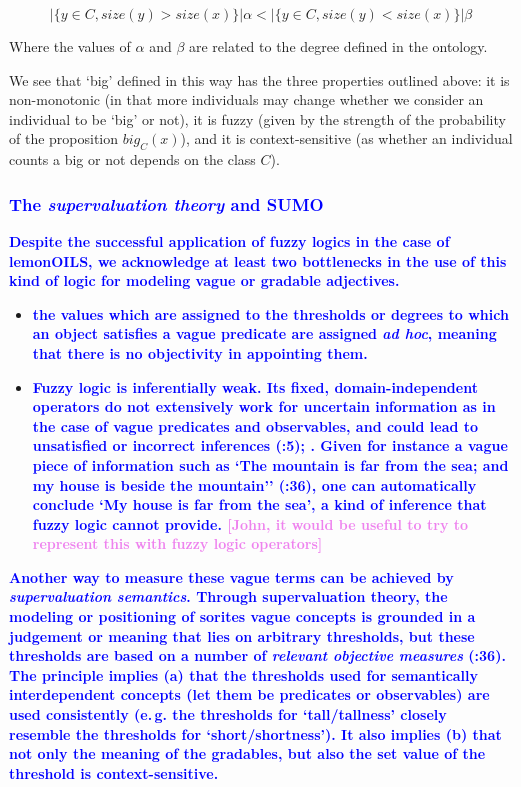 \documentclass[11pt]{article}
\begin{document}
$$|\{y \in C, size(y) > size(x)\}| \alpha < |\{y \in C, size(y) < size(x)\}| \beta$$

Where the values of $\alpha$ and $\beta$ are related to the degree defined
in the ontology.

We see that `big' defined in this way has the three properties outlined above: 
it is non-monotonic (in that more individuals may change whether we consider an individual 
to be `big' or not), it is fuzzy (given by the strength of the probability of the proposition $big_C(x)$), 
and it is context-sensitive (as whether an individual counts a big or not depends on the class $C$).

\subsubsection{\textcolor{blue}{The \textit{supervaluation theory} and SUMO}}
\textbf{\textcolor{blue}{Despite the successful application of fuzzy logics in the case of lemonOILS, we acknowledge at least two bottlenecks in the use of this kind of logic for modeling vague or gradable adjectives.}}

\begin{itemize}
\item \textbf{\textcolor{blue}{the values which are assigned to the thresholds or degrees to which an object satisfies a vague predicate are assigned \textit{ad hoc}, meaning that there is no objectivity in appointing them.}}
\item \textbf{\textcolor{blue}{Fuzzy logic is inferentially weak. Its fixed, domain-independent operators do not extensively work for uncertain information as in the case of vague predicates and observables, and could lead to unsatisfied or incorrect inferences (\cite{Elkan94fuzzy2}:5); \cite{Elkan93fuzzy1}.  Given for instance a vague piece of information such as `The mountain is far from the sea; and my house is beside the mountain'' (\cite{Bennett06kr}:36), one can automatically conclude `My house is far from the sea', a kind of inference that fuzzy logic cannot provide. \textcolor{violet}{[John, it would be useful to try to represent this with fuzzy logic operators]}}}
\end{itemize}

 \textbf{\textcolor{blue}{Another way to measure these vague terms can be achieved by \textit{supervaluation semantics}. Through supervaluation theory, the modeling or positioning of sorites vague concepts is grounded in a judgement or meaning that lies on arbitrary thresholds, but these thresholds are based on a number of \textit{relevant objective measures} (\cite{Bennett06kr}:36). The principle implies (a) that the thresholds used for semantically interdependent concepts (let them be predicates or observables) are used consistently (e.\,g. the thresholds for `tall/tallness' closely resemble the thresholds for `short/shortness'). It also implies (b) that not only the meaning of the gradables, but also the set value of the threshold is context-sensitive.}}
 
\end{document}
